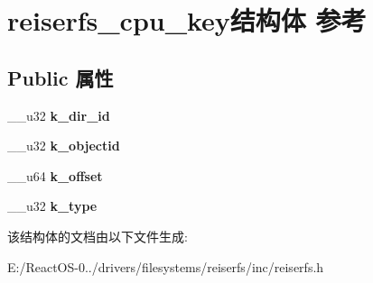 \hypertarget{structreiserfs__cpu__key}{}\section{reiserfs\+\_\+cpu\+\_\+key结构体 参考}
\label{structreiserfs__cpu__key}
\subsection*{Public 属性}
\begin{DoxyCompactItemize}
\item 
\mbox{\label{structreiserfs__cpu__key_a3674e8d53554502f03e7f2871d688ecb}} 
\+\_\+\+\_\+u32 {\bfseries k\+\_\+dir\+\_\+id}
\item 
\mbox{\label{structreiserfs__cpu__key_ac468da7f6cb26343329cbe59050276c8}} 
\+\_\+\+\_\+u32 {\bfseries k\+\_\+objectid}
\item 
\mbox{\label{structreiserfs__cpu__key_ac59ae9286935e83f826e01a9fb701bfb}} 
\+\_\+\+\_\+u64 {\bfseries k\+\_\+offset}
\item 
\mbox{\label{structreiserfs__cpu__key_a052bc2b36b1bbfea4cf61c5092124c28}} 
\+\_\+\+\_\+u32 {\bfseries k\+\_\+type}
\end{DoxyCompactItemize}


该结构体的文档由以下文件生成\+:\begin{DoxyCompactItemize}
\item 
E\+:/\+React\+O\+S-\/0../drivers/filesystems/reiserfs/inc/reiserfs.\+h\end{DoxyCompactItemize}
